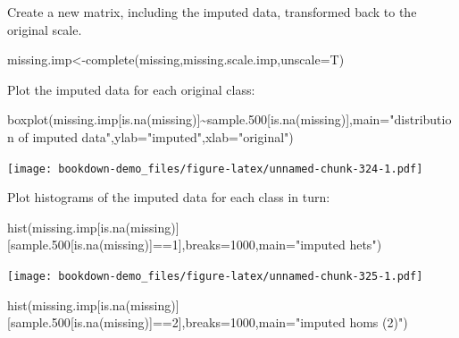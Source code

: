 \documentclass[
]{book}
\newenvironment{Shaded}{\begin{snugshade}}{\end{snugshade}}
\newcommand{\AttributeTok}[1]{\textcolor[rgb]{0.77,0.63,0.00}{#1}}
\newcommand{\DecValTok}[1]{\textcolor[rgb]{0.00,0.00,0.81}{#1}}
\newcommand{\FloatTok}[1]{\textcolor[rgb]{0.00,0.00,0.81}{#1}}
\newcommand{\FunctionTok}[1]{\textcolor[rgb]{0.00,0.00,0.00}{#1}}
\newcommand{\NormalTok}[1]{#1}
\newcommand{\OtherTok}[1]{\textcolor[rgb]{0.56,0.35,0.01}{#1}}
\newcommand{\SpecialCharTok}[1]{\textcolor[rgb]{0.00,0.00,0.00}{#1}}
\newcommand{\StringTok}[1]{\textcolor[rgb]{0.31,0.60,0.02}{#1}}
\begin{document}
Create a new matrix, including the imputed data, transformed back to the original scale.

\begin{Shaded}
\begin{Highlighting}[]
\NormalTok{missing.imp}\OtherTok{\textless{}{-}}\FunctionTok{complete}\NormalTok{(missing,missing.scale.imp,}\AttributeTok{unscale=}\NormalTok{T)}
\end{Highlighting}
\end{Shaded}

Plot the imputed data for each original class:

\begin{Shaded}
\begin{Highlighting}[]
\FunctionTok{boxplot}\NormalTok{(missing.imp[}\FunctionTok{is.na}\NormalTok{(missing)]}\SpecialCharTok{\textasciitilde{}}\NormalTok{sample}\FloatTok{.500}\NormalTok{[}\FunctionTok{is.na}\NormalTok{(missing)],}\AttributeTok{main=}\StringTok{"distribution of imputed data"}\NormalTok{,}\AttributeTok{ylab=}\StringTok{"imputed"}\NormalTok{,}\AttributeTok{xlab=}\StringTok{"original"}\NormalTok{)}
\end{Highlighting}
\end{Shaded}

\texttt{[image: bookdown-demo\_files/figure-latex/unnamed-chunk-324-1.pdf]}

Plot histograms of the imputed data for each class in turn:

\begin{Shaded}
\begin{Highlighting}[]
\FunctionTok{hist}\NormalTok{(missing.imp[}\FunctionTok{is.na}\NormalTok{(missing)][sample}\FloatTok{.500}\NormalTok{[}\FunctionTok{is.na}\NormalTok{(missing)]}\SpecialCharTok{==}\DecValTok{1}\NormalTok{],}\AttributeTok{breaks=}\DecValTok{1000}\NormalTok{,}\AttributeTok{main=}\StringTok{"imputed hets"}\NormalTok{)}
\end{Highlighting}
\end{Shaded}

\texttt{[image: bookdown-demo\_files/figure-latex/unnamed-chunk-325-1.pdf]}

\begin{Shaded}
\begin{Highlighting}[]
\FunctionTok{hist}\NormalTok{(missing.imp[}\FunctionTok{is.na}\NormalTok{(missing)][sample}\FloatTok{.500}\NormalTok{[}\FunctionTok{is.na}\NormalTok{(missing)]}\SpecialCharTok{==}\DecValTok{2}\NormalTok{],}\AttributeTok{breaks=}\DecValTok{1000}\NormalTok{,}\AttributeTok{main=}\StringTok{"imputed homs (2)"}\NormalTok{)}
\end{Highlighting}
\end{Shaded}
\end{document}
